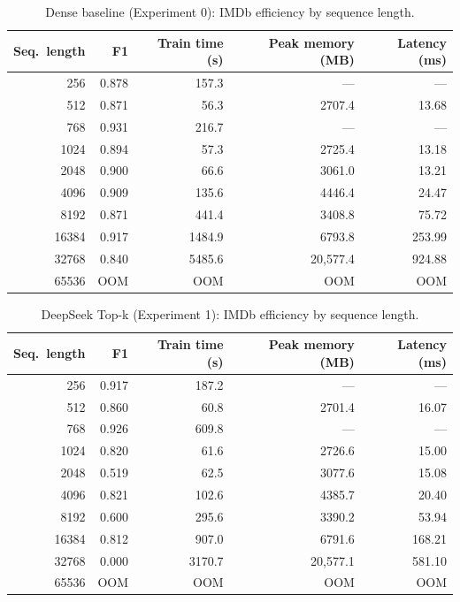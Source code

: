 \documentclass[11pt]{article}
\begin{document}
\begin{table}[ht]
  \centering
  \small
  \caption{Dense baseline (Experiment 0): IMDb efficiency by sequence length.}
  \label{tab:eff-baseline}
  \begin{tabular}{@{}rrrrr@{}}
    \toprule
    Seq.\ length & F1 & Train time (s) & Peak memory (MB) & Latency (ms) \\
    \midrule
    256    & 0.878 & 157.3   & ---      & ---   \\
    512    & 0.871 & 56.3    & 2707.4   & 13.68 \\
    768    & 0.931 & 216.7   & ---      & ---   \\
    1024   & 0.894 & 57.3    & 2725.4   & 13.18 \\
    2048   & 0.900 & 66.6    & 3061.0   & 13.21 \\
    4096   & 0.909 & 135.6   & 4446.4   & 24.47 \\
    8192   & 0.871 & 441.4   & 3408.8   & 75.72 \\
    16384  & 0.917 & 1484.9  & 6793.8   & 253.99 \\
    32768  & 0.840 & 5485.6  & 20{,}577.4 & 924.88 \\
    65536  & OOM   & OOM     & OOM      & OOM   \\
    \bottomrule
  \end{tabular}
\end{table}

\begin{table}[ht]
  \centering
  \small
  \caption{DeepSeek Top-k (Experiment 1): IMDb efficiency by sequence length.}
  \label{tab:eff-deepseek}
  \begin{tabular}{@{}rrrrr@{}}
    \toprule
    Seq.\ length & F1 & Train time (s) & Peak memory (MB) & Latency (ms) \\
    \midrule
    256    & 0.917 & 187.2  & ---      & ---   \\
    512    & 0.860 & 60.8   & 2701.4   & 16.07 \\
    768    & 0.926 & 609.8  & ---      & ---   \\
    1024   & 0.820 & 61.6   & 2726.6   & 15.00 \\
    2048   & 0.519 & 62.5   & 3077.6   & 15.08 \\
    4096   & 0.821 & 102.6  & 4385.7   & 20.40 \\
    8192   & 0.600 & 295.6  & 3390.2   & 53.94 \\
    16384  & 0.812 & 907.0  & 6791.6   & 168.21 \\
    32768  & 0.000 & 3170.7 & 20{,}577.1 & 581.10 \\
    65536  & OOM   & OOM    & OOM      & OOM   \\
    \bottomrule
  \end{tabular}
\end{table}
\end{document}

